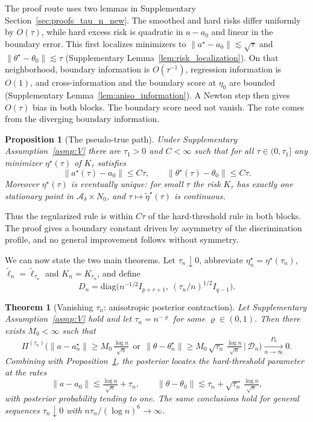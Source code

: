 \documentclass[11pt]{article}
\newtheorem{theorem}{Theorem}
\newtheorem{proposition}{Proposition}
\theoremstyle{definition}
\theoremstyle{plain}
\begin{document}
The proof route uses two lemmas in Supplementary Section~\ref{sec:proofs_tau_n_new}. The smoothed and hard risks differ uniformly by $O(\tau)$, while hard excess risk is quadratic in $a-a_0$ and linear in the boundary error. This first localizes minimizers to $\|a^\star-a_0\|\lesssim\sqrt\tau$ and $\|\theta^\star-\theta_0\|\lesssim\tau$ (Supplementary Lemma~\ref{lem:risk_localization}). On that neighborhood, boundary information is $O(\tau^{-1})$, regression information is $O(1)$, and cross-information and the boundary score at $\eta_0$ are bounded (Supplementary Lemma~\ref{lem:aniso_information}). A Newton step then gives $O(\tau)$ bias in both blocks. The boundary score need not vanish. The rate comes from the diverging boundary information.

\begin{proposition}[The pseudo-true path]
\label{prop:eta_star_bias_rate_new}
Under Supplementary Assumption~\ref{asmp:V} there are $\tau_1>0$ and $C<\infty$ such that for all $\tau\in(0,\tau_1]$ any minimizer $\eta^\star(\tau)$ of $K_\tau$ satisfies 
\begin{equation*}
    \|a^\star(\tau)-a_0\|\le C\tau, \qquad \|\theta^\star(\tau)-\theta_0\|\le C\tau.
\end{equation*}
Moreover $\eta^\star(\tau)$ is eventually unique: for small $\tau$ the risk $K_\tau$ has exactly one stationary point in $\mathcal A_\delta\times N_0$, and $\tau\mapsto\tilde\eta^\star(\tau)$ is continuous.
\end{proposition}

Thus the regularized rule is within $C\tau$ of the hard-threshold rule in both blocks. The proof gives a boundary constant driven by asymmetry of the discrimination profile, and no general improvement follows without symmetry.

We can now state the two main theorems. Let $\tau_n\downarrow0$, abbreviate $\eta_n^\star=\eta^\star(\tau_n)$, $\tilde\ell_n=\tilde\ell_{\tau_n}$ and $K_n=K_{\tau_n}$, and define
\[
D_n=\mathrm{diag}\big(n^{-1/2}I_{p+r+1},\ (\tau_n/n)^{1/2}I_{q-1}\big).
\]

\begin{theorem}[Vanishing $\tau_n$: anisotropic posterior contraction]
\label{thm:tau_contraction_new}
Let Supplementary Assumption~\ref{asmp:V} hold and let $\tau_n=n^{-\varrho}$ for some $\varrho\in(0,1)$. Then there exists $M_0<\infty$ such that
\[
\Pi^{(\tau_n)}\Big(\|a-a_n^\star\|\ge M_0\,\tfrac{\log n}{\sqrt n}
\ \ \text{or}\ \
\|\theta-\theta_n^\star\|\ge M_0\,\sqrt{\tau_n}\,\tfrac{\log n}{\sqrt n}
\,\Big|\,\mathcal D_n\Big)
\xrightarrow[n\to\infty]{P_0}0 .
\]
Combining with Proposition~\ref{prop:eta_star_bias_rate_new}, the posterior locates the hard-threshold parameter at the rates
\[
\|a-a_0\|\lesssim \tfrac{\log n}{\sqrt n}+\tau_n,
\qquad
\|\theta-\theta_0\|\lesssim \tau_n+\sqrt{\tau_n}\,\tfrac{\log n}{\sqrt n},
\]
with posterior probability tending to one. The same conclusions hold for general sequences $\tau_n\downarrow0$ with $n\tau_n/(\log n)^{6}\to\infty$.
\end{theorem}
\end{document}
